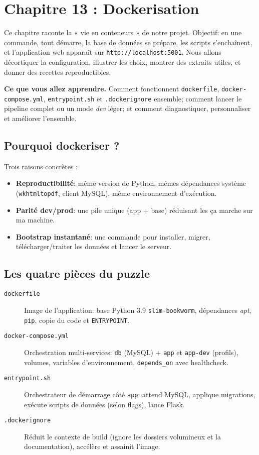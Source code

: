 \chapter{Chapitre 13 : Dockerisation}

Ce chapitre raconte la « vie en conteneurs » de notre projet. Objectif: en une commande, tout démarre, la base de données se prépare, les scripts s'enchaînent, et l'application web apparaît sur \texttt{http://localhost:5001}. Nous allons décortiquer la configuration, illustrer les choix, montrer des extraits utiles, et donner des recettes reproductibles.

\medskip
\noindent\textbf{Ce que vous allez apprendre.} Comment fonctionnent \texttt{dockerfile}, \texttt{docker-compose.yml}, \texttt{entrypoint.sh} et \texttt{.dockerignore} ensemble; comment lancer le pipeline complet ou un mode \textit{dev} léger; et comment diagnostiquer, personnaliser et améliorer l'ensemble.

\section{Pourquoi dockeriser ?}

Trois raisons concrètes :
\begin{itemize}
  \item \textbf{Reproductibilité}: même version de Python, mêmes dépendances système (\texttt{wkhtmltopdf}, client MySQL), même environnement d'exécution.
  \item \textbf{Parité dev/prod}: une pile unique (app + base) réduisant les \og ça marche sur ma machine\fg{}.
  \item \textbf{Bootstrap instantané}: une commande pour installer, migrer, télécharger/traiter les données et lancer le serveur.
\end{itemize}

\section{Les quatre pièces du puzzle}

\begin{description}
  \item[\texttt{dockerfile}] Image de l'application: base Python 3.9 \texttt{slim-bookworm}, dépendances \textit{apt}, \texttt{pip}, copie du code et \texttt{ENTRYPOINT}.
  \item[\texttt{docker-compose.yml}] Orchestration multi-services: \texttt{db} (MySQL) + \texttt{app} et \texttt{app-dev} (profils), volumes, variables d'environnement, \texttt{depends\_on} avec healthcheck.
  \item[\texttt{entrypoint.sh}] Orchestrateur de démarrage côté \texttt{app}: attend MySQL, applique migrations, exécute scripts de données (selon flags), lance Flask.
  \item[\texttt{.dockerignore}] Réduit le contexte de build (ignore les dossiers volumineux et la documentation), accélère et assainit l'image.
\end{description}


